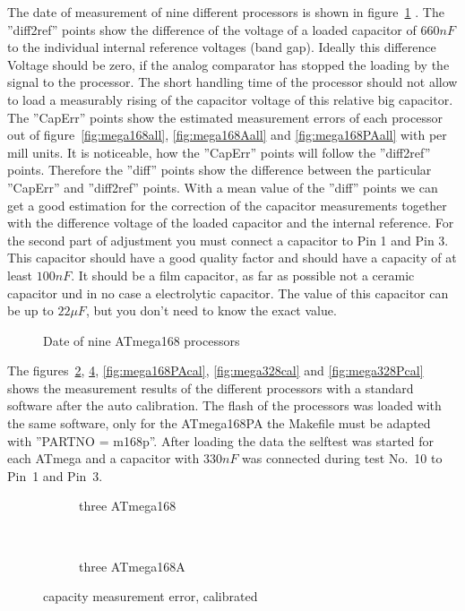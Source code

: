 The date of measurement of nine different processors is shown in figure~\ref{fig:CompAdjust} .
The ''diff2ref'' points show the difference of the voltage of a loaded capacitor of \(660 nF\) to the
individual internal reference voltages (band gap).
Ideally this difference Voltage should be zero, if the analog comparator has stopped the loading by the signal to
the processor. The short handling time of the processor should not allow to load a measurably rising of the 
capacitor voltage of this relative big capacitor.
The ''CapErr'' points show the estimated measurement errors of each processor out of figure~\ref{fig:mega168all}, \ref{fig:mega168Aall} 
and \ref{fig:mega168PAall} with per mill units.
It is noticeable, how the ''CapErr'' points will follow the ''diff2ref'' points.
Therefore the ''diff'' points show the difference between the particular ''CapErr'' and ''diff2ref'' points.
With a mean value of the ''diff'' points we can get a good estimation for the correction of the capacitor measurements 
together with the difference voltage of the loaded capacitor and the internal reference.
For the second part of adjustment you must connect a capacitor to Pin 1 and Pin 3. This capacitor should have
a good quality factor and should have a capacity of at least \(100 nF\).
It should be a film capacitor, as far as possible not a ceramic capacitor und in no case a electrolytic capacitor.
The value of this capacitor can be up to \(22 \mu F\), but you don't need to know the exact value.

\begin{figure}[H]
\centering

\caption{Date of nine ATmega168 processors}
\label{fig:CompAdjust}
\end{figure}

The figures~\ref{fig:mega168cal}, \ref{fig:mega168Acal}, \ref{fig:mega168PAcal}, \ref{fig:mega328cal} and \ref{fig:mega328Pcal}
 shows the measurement results
of the different processors with a standard software after the auto calibration.
The flash of the processors was loaded with the same software, only for the ATmega168PA the Makefile must be
adapted with ''PARTNO = m168p''.
After loading the data the selftest was started for each ATmega and a capacitor with \(330 nF\) was connected
during test No.~10 to Pin~1 and Pin~3.

\begin{figure}[H]
  \begin{subfigure}[b]{9cm}
    \centering
    \resizebox{9cm}{!}{}
    \caption{three ATmega168}
    \label{fig:mega168cal}
  \end{subfigure}
  ~
  \begin{subfigure}[b]{9cm}
    \centering
    \resizebox{9cm}{!}{}
    \caption{three ATmega168A}
    \label{fig:mega168Acal}
  \end{subfigure}
  \caption{capacity measurement error, calibrated}
\end{figure}

